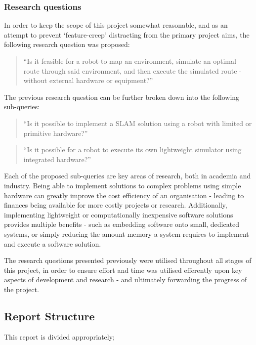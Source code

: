 \subsubsection{Research questions}
In order to keep the scope of this project somewhat reasonable, and as an
attempt to prevent `feature-creep' distracting from the primary project aims,
the following research question was proposed:
\begin{quote}
    ``Is it feasible for a robot to map an environment, simulate an optimal route
    through said environment, and then execute the simulated route - without
    external hardware or equipment?''
\end{quote}

The previous research question can be further broken down into the following
sub-queries:

\begin{quote}
    ``Is it possible to implement a SLAM solution using a robot with limited or
    primitive hardware?''
\end{quote}

\begin{quote}
    ``Is it possible for a robot to execute its own lightweight simulator using
    integrated hardware?''
\end{quote}

Each of the proposed sub-queries are key areas of research, both in academia
and industry.
Being able to implement solutions to complex problems using simple hardware
can greatly improve the cost efficiency of an organisation - leading to
finances being available for more costly projects or research. 
Additionally, implementing lightweight or computationally inexpensive software
solutions provides multiple benefits - such as embedding software onto small,
dedicated systems, or simply reducing the amount memory a system requires to
implement and execute a software solution. 

The research questions presented previously were utilised throughout all
stages of this project, in order to ensure effort and time was utilised
efferently upon key aspects of development and research - and ultimately
forwarding the progress of the project.

\subsection{Report Structure}
This report is divided appropriately;

